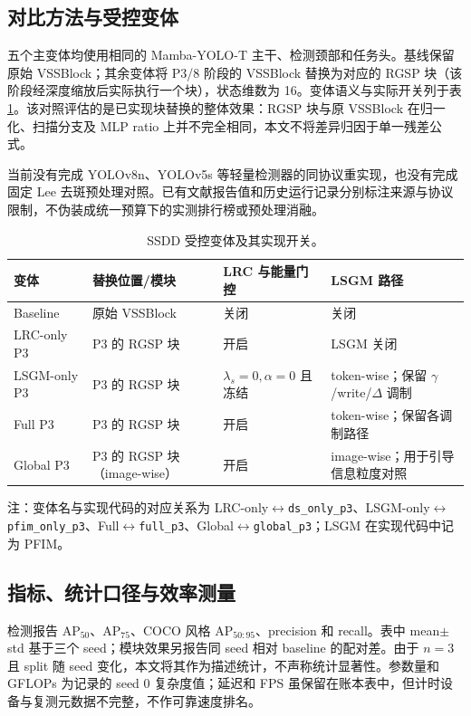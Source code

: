 \documentclass[UTF8,12pt,a4paper]{ctexart}
\begin{document}
\subsection{对比方法与受控变体}
五个主变体均使用相同的 Mamba-YOLO-T 主干、检测颈部和任务头。基线保留原始 VSSBlock；其余变体将 P3/8 阶段的 VSSBlock 替换为对应的 RGSP 块（该阶段经深度缩放后实际执行一个块），状态维数为 16。变体语义与实际开关列于表\ref{tab:variants}。该对照评估的是已实现块替换的整体效果：RGSP 块与原 VSSBlock 在归一化、扫描分支及 MLP ratio 上并不完全相同，本文不将差异归因于单一残差公式。

当前没有完成 YOLOv8n、YOLOv5s 等轻量检测器的同协议重实现，也没有完成固定 Lee 去斑预处理对照。已有文献报告值和历史运行记录分别标注来源与协议限制，不伪装成统一预算下的实测排行榜或预处理消融。
\begin{table}[H]\centering\scriptsize
\caption{SSDD 受控变体及其实现开关。}
\label{tab:variants}
\begin{tabularx}{\linewidth}{p{2.5cm}p{3.2cm}p{3.0cm}X}
\toprule
变体 & 替换位置/模块 & LRC 与能量门控 & LSGM 路径\\
\midrule
Baseline & 原始 VSSBlock & 关闭 & 关闭\\
LRC-only P3 & P3 的 RGSP 块 & 开启 & LSGM 关闭\\
LSGM-only P3 & P3 的 RGSP 块 & $\lambda_s=0,\alpha=0$ 且冻结 & token-wise；保留 $\gamma$/write/$\Delta$ 调制\\
Full P3 & P3 的 RGSP 块 & 开启 & token-wise；保留各调制路径\\
Global P3 & P3 的 RGSP 块（image-wise） & 开启 & image-wise；用于引导信息粒度对照\\
\bottomrule
\end{tabularx}
\end{table}

{\footnotesize 注：变体名与实现代码的对应关系为 LRC-only$\leftrightarrow$\texttt{ds\_only\_p3}、LSGM-only$\leftrightarrow$\texttt{pfim\_only\_p3}、Full$\leftrightarrow$\texttt{full\_p3}、Global$\leftrightarrow$\texttt{global\_p3}；LSGM 在实现代码中记为 PFIM。}

\subsection{指标、统计口径与效率测量}
检测报告 AP$_{50}$、AP$_{75}$、COCO 风格 AP$_{50:95}$、precision 和 recall。表中 mean$\pm$std 基于三个 seed；模块效果另报告同 seed 相对 baseline 的配对差。由于 $n=3$ 且 split 随 seed 变化，本文将其作为描述统计，不声称统计显著性。参数量和 GFLOPs 为记录的 seed 0 复杂度值；延迟和 FPS 虽保留在账本表中，但计时设备与复测元数据不完整，不作可靠速度排名。
\end{document}

